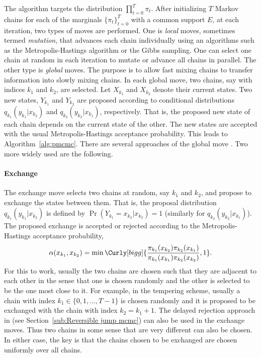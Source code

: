 The algorithm targets the distribution $\prod_{t=0}^T\pi_t$. After
initializing $T$ Markov chains for each of the marginals $\{\pi_t\}_{t=0}^T$
with a common support $E$, at each iteration, two types of moves are
performed. One is \emph{local} moves, sometimes termed \emph{mutation}, that
advances each chain individually using an \mcmc algorithms such as the
Metropolis-Hastings algorithm or the Gibbs sampling. One can select one chain
at random in each iteration to mutate or advance all chains in parallel. The
other type is \emph{global} moves. The purpose is to allow fast mixing chains
to transfer information into slowly mixing chains. In each global move, two
chains, say with indices $k_1$ and $k_2$, are selected. Let $X_{k_1}$ and
$X_{k_2}$ denote their current states. Two new states, $Y_{k_1}$ and
$Y_{k_2}$ are proposed according to conditional distributions
$q_{k_1}(y_{k_1}|x_{k_2})$ and $q_{k_2}(y_{k_2}|x_{k_1})$, respectively. That
is, the proposed new state of each chain depends on the current state of the
other. The new states are accepted with the usual Metropolis-Hastings
acceptance probability. This leads to Algorithm~\ref{alg:pmcmc}. There are
several approaches of the global move \cite{Jasra:2007in}. Two more widely
used are the following.



\paragraph{Exchange}

The exchange move selects two chains at random, say $k_1$ and $k_2$, and
propose to exchange the states between them. That is, the proposal
distribution $q_{k_1}(y_{k_1}|x_{k_2})$ is defined by
$\Pr(Y_{k_1}=x_{k_2}|x_{k_2}) = 1$ (similarly for
$q_{k_2}(y_{k_2}|x_{k_1})$). The proposed exchange is accepted or rejected
according to the Metropolis-Hastings acceptance probability,
\begin{equation}
  \alpha(x_{k_1}, x_{k_2}) =
  \min\Curly[bigg]{
  \frac{\pi_{k_1}(x_{k_2})\pi_{k_2}(x_{k_1})}
  {\pi_{k_1}(x_{k_1})\pi_{k_2}(x_{k_2})}, 1}.
  \label{eq:exchange accept}
\end{equation}
For this to work, usually the two chains are chosen such that they are
adjacent to each other in the sense that one is chosen randomly and the other
is selected to be the one most close to it. For example, in the tempering
scheme, usually a chain with index $k_1 \in\{0,1,\dots,T-1\}$ is chosen
randomly and it is proposed to be exchanged with the chain with index $k_2 =
k_1 + 1$. The delayed rejection approach in \cite{Green:2001tk} (see
Section~\ref{sub:Reversible jump mcmc}) can also be used in the exchange
moves. Thus two chains in some sense that are very different can also be
chosen. In either case, the key is that the chains chosen to be exchanged are
chosen uniformly over all chains.

